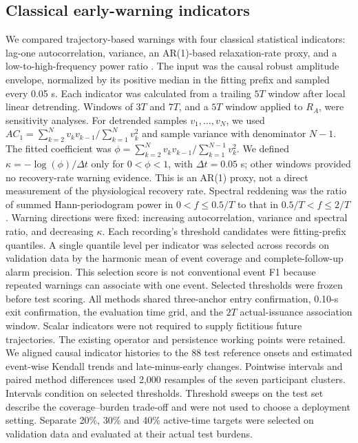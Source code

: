 \subsection{Classical early-warning indicators}
We compared trajectory-based warnings with four classical statistical indicators: lag-one autocorrelation, variance, an AR(1)-based relaxation-rate proxy, and a low-to-high-frequency power ratio \cite{Dakos2012EWS}. The input was the causal robust amplitude envelope, normalized by its positive median in the fitting prefix and sampled every 0.05 s. Each indicator was calculated from a trailing $5T$ window after local linear detrending. Windows of $3T$ and $7T$, and a $5T$ window applied to $R_A$, were sensitivity analyses.
For detrended samples $v_1,\ldots,v_N$, we used $AC_1=\sum_{k=2}^N v_kv_{k-1}/\sum_{k=1}^N v_k^2$ and sample variance with denominator $N-1$. The fitted coefficient was $\phi=\sum_{k=2}^N v_kv_{k-1}/\sum_{k=1}^{N-1}v_k^2$. We defined $\kappa=-\log(\phi)/\Delta t$ only for $0<\phi<1$, with $\Delta t=0.05$ s; other windows provided no recovery-rate warning evidence. This is an AR(1) proxy, not a direct measurement of the physiological recovery rate. Spectral reddening was the ratio of summed Hann-periodogram power in $0<f\leq0.5/T$ to that in $0.5/T<f\leq2/T$.
Warning directions were fixed: increasing autocorrelation, variance and spectral ratio, and decreasing $\kappa$. Each recording's threshold candidates were fitting-prefix quantiles. A single quantile level per indicator was selected across records on validation data by the harmonic mean of event coverage and complete-follow-up alarm precision. This selection score is not conventional event F1 because repeated warnings can associate with one event. Selected thresholds were frozen before test scoring. All methods shared three-anchor entry confirmation, 0.10-s exit confirmation, the evaluation time grid, and the $2T$ actual-issuance association window. Scalar indicators were not required to supply fictitious future trajectories. The existing operator and persistence working points were retained.
We aligned causal indicator histories to the 88 test reference onsets and estimated event-wise Kendall trends and late-minus-early changes. Pointwise intervals and paired method differences used 2,000 resamples of the seven participant clusters. Intervals condition on selected thresholds. Threshold sweeps on the test set describe the coverage--burden trade-off and were not used to choose a deployment setting. Separate 20\%, 30\% and 40\% active-time targets were selected on validation data and evaluated at their actual test burdens.
